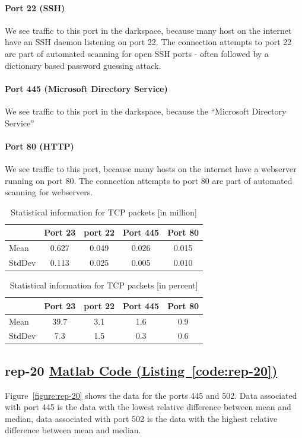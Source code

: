 \documentclass{article}
\newcommand{\codelink}[1]{%
    \hyperref[#1]{\quad\faArrowCircleRight\enskip Matlab Code (Listing~\ref{#1})}%
}
\begin{document}
\paragraph{Port 22 (SSH)}
We see traffic to this port in the darkspace, because many host on the internet have an
SSH daemon listening on port 22. The connection attempts to port 22 are part of automated scanning
for open SSH ports - often followed by a dictionary based password guessing attack.

\paragraph{Port 445 (Microsoft Directory Service)}
We see traffic to this port in the darkspace, because the ``Microsoft Directory Service'' 

\paragraph{Port 80 (HTTP)}
We see traffic to this port, because many hosts on the internet have a webserver running
on port 80. The connection attempts to port 80 are part of automated scanning for webservers.

\begin{table}[H]
    \centering
    \begin{tabular}{l|cccc}
        & Port 23 & port 22 & Port  445 & Port 80 \\
        \hline
        Mean &  0.627 & 0.049 & 0.026 & 0.015 \\
        StdDev &  0.113 & 0.025 & 0.005 & 0.010 \\
    \end{tabular}
    \caption{\label{table:rep-19-absolute} Statistical information for TCP packets [in million]}
\end{table}

\begin{table}[H]
    \centering
    \begin{tabular}{l|cccc}
        & Port 23 & port 22 & Port  445 & Port 80 \\
        \hline
        Mean &   39.7 & 3.1 & 1.6 & 0.9  \\
        StdDev & 7.3  & 1.5 & 0.3 & 0.6   \\
    \end{tabular}
    \caption{\label{table:rep-19-absolute} Statistical information for TCP packets [in percent]}
\end{table}

\subsection{rep-20 \codelink{code:rep-20}}
Figure~\ref{figure:rep-20} shows the data for the ports 445 and 502. Data associated with port 445 is
the data with the lowest relative difference between mean and median, data associated with port 502 is
the data with the highest relative difference between mean and median.
\end{document}
